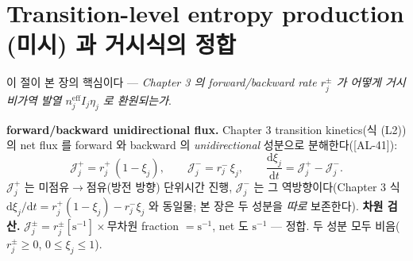 \documentclass[11pt,a4paper]{article}
\newcommand{\dd}{\mathrm{d}}
\newcommand{\eff}{\mathrm{eff}}
\newcommand{\AL}[1]{\textsf{[AL-#1]}}
\begin{document}
\section{Transition-level entropy production (미시) 과 거시식의 정합}\label{sec:ch4_tr}
이 절이 본 장의 핵심이다 — \emph{Chapter 3 의 forward/backward rate $r_j^\pm$ 가 어떻게 거시 비가역 발열
$n_j^{\eff}I_j\eta_j$ 로 환원되는가}.

\textbf{forward/backward unidirectional flux.} Chapter 3 transition kinetics(식 (L2))의 net flux 를 forward 와
backward 의 \emph{unidirectional} 성분으로 분해한다(\AL{41}):
\begin{equation}
\mathcal J_j^+=r_j^+\,(1-\xi_j),\qquad \mathcal J_j^-=r_j^-\,\xi_j,\qquad
\frac{\dd\xi_j}{\dd t}=\mathcal J_j^+-\mathcal J_j^-.
\label{eq:ch4_Jpm}
\end{equation}
$\mathcal J_j^+$ 는 미점유$\to$점유(방전 방향) 단위시간 진행, $\mathcal J_j^-$ 는 그 역방향이다(Chapter 3
식 $\dd\xi_j/\dd t=r_j^+(1-\xi_j)-r_j^-\xi_j$ 와 동일물; 본 장은 두 성분을 \emph{따로} 보존한다). \textbf{차원
검산.} $\mathcal J_j^\pm=r_j^\pm[\mathrm{s^{-1}}]\times$무차원 fraction $=\mathrm{s^{-1}}$, net 도 $\mathrm{s^{-1}}$
— 정합. 두 성분 모두 비음($r_j^\pm\ge0$, $0\le\xi_j\le1$).
\end{document}

